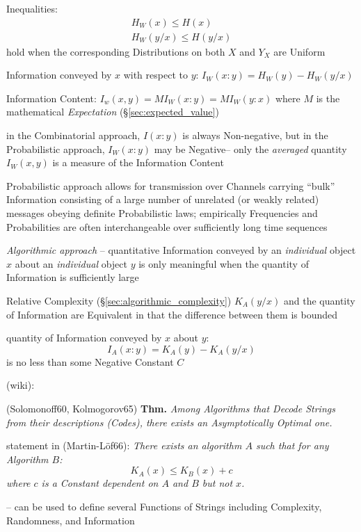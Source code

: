 Inequalities:
\begin{align*}
  H_W(x) \leq H(x) \\
  H_W(y/x) \leq H(y/x)
\end{align*}
hold when the corresponding Distributions on both $X$ and $Y_X$ are Uniform

Information conveyed by $x$ with respect to $y$: $I_W(x:y) = H_W(y) - H_W(y/x)$

Information Content: $I_w(x,y) = MI_W(x : y) = MI_W(y : x)$ where $M$ is the
mathematical \emph{Expectation} (\S\ref{sec:expected_value})

in the Combinatorial approach, $I(x:y)$ is always Non-negative, but in the
Probabilistic approach, $I_W(x:y)$ may be Negative-- only the \emph{averaged}
quantity $I_W(x,y)$ is a measure of the Information Content

Probabilistic approach allows for transmission over Channels carrying ``bulk''
Information consisting of a large number of unrelated (or weakly related)
messages obeying definite Probabilistic laws; empirically Frequencies and
Probabilities are often interchangeable over sufficiently long time sequences

\emph{Algorithmic approach} -- quantitative Information conveyed by an
\emph{individual} object $x$ about an \emph{individual} object $y$ is only
meaningful when the quantity of Information is sufficiently large

Relative Complexity (\S\ref{sec:algorithmic_complexity}) $K_A(y/x)$ and the
quantity of Information are Equivalent in that the difference between them is
bounded

quantity of Information conveyed by $x$ about $y$:
\[
  I_A(x:y) = K_A(y) - K_A(y/x)
\]
is no less than some Negative Constant $C$

(wiki):

(Solomonoff60, Kolmogorov65) \textbf{Thm.}
\emph{Among Algorithms that Decode Strings from their descriptions (Codes),
  there exists an Asymptotically Optimal one.}

statement in (Martin-L\"of66):
\emph{
  There exists an algorithm $A$ such that for any Algorithm $B$:
  \[
    K_A(x) \leq K_B(x) + c
  \]
  where $c$ is a Constant dependent on $A$ and $B$ but not $x$.
}

-- can be used to define several Functions of Strings including Complexity,
Randomness, and Information



